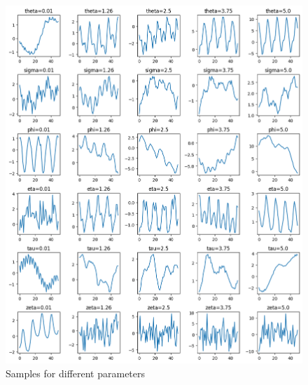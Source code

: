 \documentclass[12pt]{article}
\begin{document}
\begin{figure}[h]
\centering
\begin{minipage}{.5\textwidth}
\includegraphics[scale = 0.35]{outputs/q2/c-parameter-samples}
\caption{Samples for different parameters}
\label{fig:fig2-c-parameter-samples}
  \centering
\end{minipage}%
\begin{minipage}{.5\textwidth}
  \centering

\end{minipage}
\end{figure}
\end{document}
